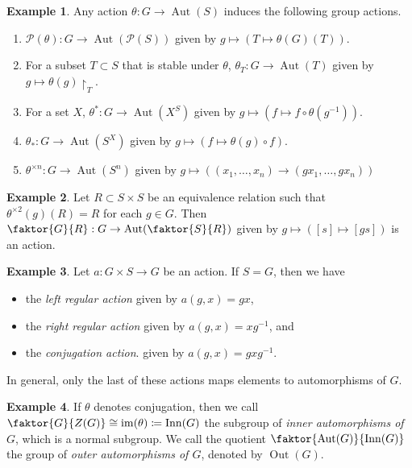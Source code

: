 \documentclass[10pt,letterpaper,cm]{nupset}
\theoremstyle{definition}
\newtheorem{exmp}{Example}
\newcommand{\1}{\mathbf{1}}
\newcommand{\0}{\vec 0}
\DeclareMathOperator{\aut}{Aut}
\DeclareMathOperator{\inn}{Inn}
\DeclareMathOperator{\out}{Out}
\DeclareMathOperator{\im}{im}
\begin{document}
\theoremstyle{exmp}
\begin{exmp}{Any action $\theta : G \to \aut(S)$ induces the following group actions.}


\begin{enumerate}
\item $\mathcal{P}(\theta) : G \to \aut(\mathcal{P}(S))$ given by $g \mapsto (T \mapsto \theta(G)(T))$.
\item For a subset $T \subset S$ that is stable under $\theta$, $\theta_T : G \to \aut(T)$ given by $g \mapsto \theta(g)\restriction_T$.
\item For a set $X$, $\theta^\ast : G \to \aut(X^S)$ given by $g \mapsto (f \mapsto f \circ \theta(g^{-1}))$.
\item $\theta_{\ast}: G \to \aut(S^X)$ given by $g\mapsto (f \mapsto \theta(g) \circ f)$.
\item $\theta^{\times n} : G \to \aut(S^n)$ given by $g \mapsto ((x_1, \ldots, x_n) \to (gx_1, \ldots, gx_n))$

\end{enumerate}

\end{exmp}

\begin{exmp}
Let $R\subset S \times S$ be an equivalence relation such that $\theta^{\times 2}(g)(R) = R$ for each $g 
\in G$. Then $\faktor{G}{R}: G \to \aut(\faktor{S}{R})$ given by $g \mapsto ([s] \mapsto [gs])$ is an action.
\end{exmp}

\begin{exmp}
Let $a : G \times S \to G$ be an action. If $S = G$, then we have 
\begin{itemize}
\item the \textit{left regular action} given by $a(g, x) = gx$, 
\item the \textit{right regular action} given by $a(g, x) = xg^{-1}$, and 
\item the \textit{conjugation action}. given by $a(g, x) = gx g^{-1}$.
\end{itemize}
In general, only the last of these actions maps elements to automorphisms of $G$.
\end{exmp}

\begin{exmp}
If $\theta$ denotes conjugation, then we call $\faktor{G}{Z(G)} \cong \im(\theta)\coloneqq  \inn(G)$ the subgroup of \textit{inner automorphisms of $G$}, which is a normal subgroup. We call the quotient $\faktor{\aut(G)}{\inn(G)}$ the group of \textit{outer automorphisms of $G$}, denoted by $\out(G)$.
\end{exmp}
\end{document}
